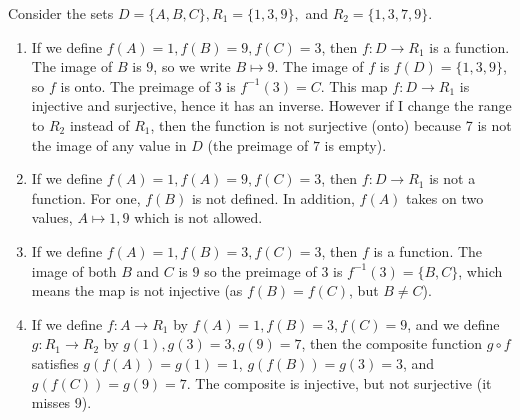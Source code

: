 \begin{example}
Consider the sets $D=\{A,B,C\}, R_1=\{1,3,9\},$ and $R_2=\{1,3,7,9\}$.
\begin{enumerate}
	\item If we define $f(A)=1,f(B)=9,f(C)=3$, then $f:D\to R_1$ is a function.  The image of $B$ is $9$, so we write $B\mapsto 9$. The image of $f$ is $f(D)=\{1,3,9\}$, so $f$ is onto. The preimage of $3$ is $f^{-1}(3)=C$. This map $f:D\to R_1$ is injective and surjective, hence it has an inverse. However if I change the range to $R_2$ instead of $R_1$, then the function is not surjective (onto) because 7 is not the image of any value in $D$ (the preimage of $7$ is empty).
	\item If we define $f(A)=1,f(A)=9,f(C)=3$, then $f:D\to R_1$ is not a function. For one, $f(B)$ is not defined. In addition, $f(A)$ takes on two values, $A\mapsto 1,9$ which is not allowed.
	\item If we define $f(A)=1,f(B)=3,f(C)=3$, then $f$ is a function.  The image of both $B$ and $C$ is $9$ so the preimage of $3$ is $f^{-1}(3)=\{B,C\}$, which means the map is not injective (as $f(B)=f(C)$, but $B\neq C$).
	\item If we define $f:A\to R_1$ by $f(A)=1,f(B)=3,f(C)=9$, and we define $g:R_1\to R_2$ by $g(1),g(3)=3,g(9)=7$, then the composite function $g\circ f$ satisfies $g(f(A))=g(1)=1$, $g(f(B))=g(3)=3$, and $g(f(C))=g(9)=7$. The composite is injective, but not surjective (it misses 9). 
\end{enumerate}
\end{example}

